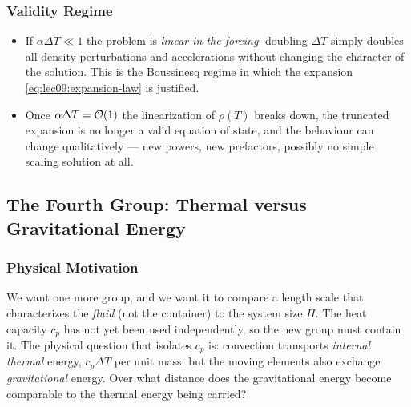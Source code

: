 \subsubsection*{Validity Regime}
\begin{itemize}
    \item If $\alpha\Delta T\ll 1$ the problem is \emph{linear in the
    forcing}: doubling $\Delta T$ simply doubles all density perturbations and
    accelerations without changing the character of the solution. This is the
    Boussinesq regime in which the expansion
    \eqref{eq:lec09:expansion-law} is justified.
    \item Once $\alpha\Delta T=\order{1}$ the linearization of $\rho(T)$
    breaks down, the truncated expansion is no longer a valid equation of
    state, and the behaviour can change qualitatively --- new powers, new
    prefactors, possibly no simple scaling solution at all.
\end{itemize}


\subsection{The Fourth Group: Thermal versus Gravitational Energy}
\label{sec:lec09:fourth-group}

\subsubsection*{Physical Motivation}
We want one more group, and we want it to compare a length scale that
characterizes the \emph{fluid} (not the container) to the system size $H$. The
heat capacity $c_p$ has not yet been used independently, so the new group must
contain it. The physical question that isolates $c_p$ is: convection
transports \emph{internal thermal} energy, $c_p\Delta T$ per unit mass; but
the moving elements also exchange \emph{gravitational} energy. Over what
distance does the gravitational energy become comparable to the thermal energy
being carried?

